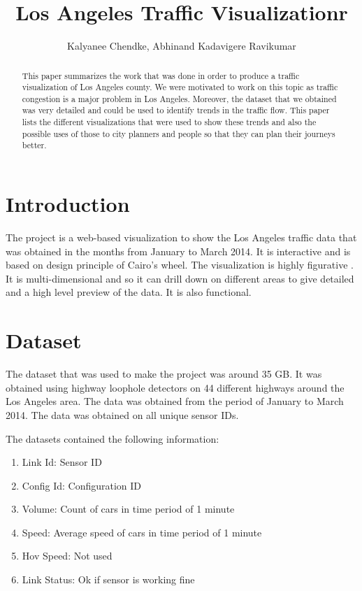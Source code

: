 \documentclass{llncs}
\begin{document}
\title{Los Angeles Traffic Visualizationr}

\author{Kalyanee Chendke, Abhinand Kadavigere Ravikumar}

\maketitle

\begin{abstract}

This paper summarizes the work that was done in order to produce a traffic visualization of Los Angeles county. We were motivated to work on this topic as traffic congestion is a major problem in Los Angeles. Moreover, the dataset that we obtained was very detailed and could be used to identify trends in the traffic flow. This paper lists the different visualizations that were used to show these trends and also the possible uses of those to city planners and people so that they can plan their journeys better. 

\end{abstract}

\section{Introduction}\label{sec:Introduction}

The project is a web-based visualization to show the Los Angeles traffic data that was obtained in the months from January to March 2014.  It is interactive and is based on design principle of Cairo's wheel. The visualization is highly figurative . It is multi-dimensional and so it can drill down on different areas to give detailed and a high level preview of the data. It is also functional.  


\section{Dataset}\label{sec:Others}

The dataset that was used to make the project was around 35 GB. It was obtained using highway loophole detectors on 44 different highways around the Los Angeles area. The data was obtained from the period of January to March 2014. The data was obtained on all unique sensor IDs.

The datasets contained the following information:

\begin{enumerate}
\item Link Id: Sensor ID
\item Config Id: Configuration ID
\item Volume: Count of cars in time period of 1 minute
\item Speed: Average speed of cars in time period of 1 minute
\item Hov Speed: Not used
\item Link Status: Ok if sensor is working fine
\end{enumerate}
\end{document}
